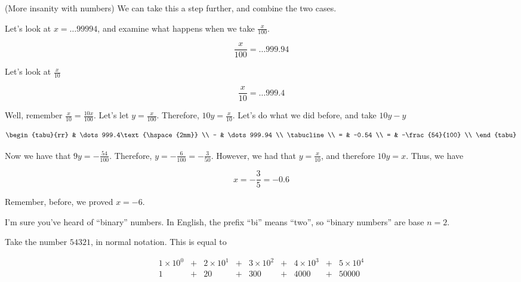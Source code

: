 \begin{example}(More insanity with numbers)
  We can take this a step further, and combine the two cases.

  Let's look at $x = \dots99994$, and examine what happens when we
  take $\frac{x}{100}$.

  \begin{displaymath}
    \frac{x}{100} = \dots999.94
  \end{displaymath}

  Let's look at $\frac{x}{10}$

  \begin{displaymath}
    \frac{x}{10} = \dots999.4
  \end{displaymath}

  Well, remember $\frac{x}{10} = \frac{10x}{100}$. Let's let
  $y = \frac{x}{100}$. Therefore, $10y = \frac{x}{10}$. Let's do what
  we did before, and take $10y - y$

  \begin{displaymath}
    \begin{tabu}{rr}
        & \dots999.4\text{\hspace{2mm}} \\
      - & \dots999.94 \\
      \tabucline \\
      = & -0.54 \\
      = & -\frac{54}{100} \\
    \end{tabu}
  \end{displaymath}

  Now we have that $9y = -\frac{54}{100}$. Therefore, $y =
  -\frac{6}{100} = -\frac{3}{50}$. However, we had that $y =
  \frac{x}{10}$, and therefore $10y = x$. Thus, we have

  \begin{displaymath}
    x = -\frac{3}{5} = -0.6
  \end{displaymath}

  Remember, before, we proved $x = -6$.
\end{example}

\begin{example}[The problem with representations in numerical bases
  other than $n = 10$]
  I'm sure you've heard of ``binary'' numbers. In English, the prefix
  ``bi'' means ``two'', so ``binary numbers'' are base $n = 2$.

  Take the number $54321$, in normal notation. This is equal to

  \begin{displaymath}
    \begin{array}{ccccccccc}
      1 \times 10^0 & + & 2 \times 10^1 & + & 3 \times 10^2 & + & 4 \times 10^3 & + & 5 \times 10^4 \\
      1 & + & 20 & + & 300 & + & 4000 & + & 50000 \\
    \end{array}
  \end{displaymath}


\end{example}

